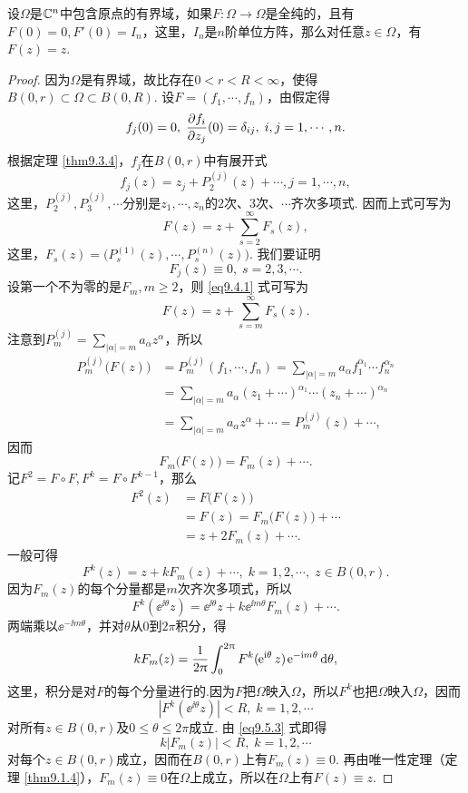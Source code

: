 \begin{theorem}\label{thm9.5.1}
设$\Omega$是$\mathbb C^n$中包含原点的有界域，如果$F:\Omega\to\Omega$是全纯的，且有$F(0)=0,F'(0)= I_n$，这里，$I_n$是$n$阶单位方阵，那么对任意$z\in\Omega$，有$F(z)=z$.
\end{theorem}
\begin{proof}
因为$\Omega$是有界域，故比存在$0<r<R<\infty$，使得$B(0,r)\subset\Omega\subset B(0,R)$. 设$F=(f_1,\cdots,f_n)$，由假定得
\[f_j(0)=0,\;\frac{\partial f_i}{\partial z_j}(0)=\delta_{ij},\;i,j=1,\cdots,n.\]
根据定理 \ref{thm9.3.4}，$f_j$在$B(0,r)$中有展开式
\[f_j(z)=z_j+P_2^{(j)}(z)+\cdots,j=1,\cdots,n,\]
这里，$P_2^{(j)},P_3^{(j)},\cdots$分别是$z_1,\cdots,z_n$的$2$次、$3$次、$\cdots$齐次多项式. 因而上式可写为
\begin{equation}\label{eq9.5.1}
F(z)=z+\sum_{s=2}^\infty F_s(z),
\end{equation}
这里，$F_s(z)=\big(P_s^{(1)}(z),\cdots,P_s^{(n)}(z)\big)$. 我们要证明
\[F_j(z)\equiv0,\;s=2,3,\cdots.\]
设第一个不为零的是$F_m,m\ge2$，则 \eqref{eq9.4.1} 式可写为
\begin{equation}\label{eq9.5.2}
F(z)=z+\sum_{s=m}^\infty F_s(z).
\end{equation}
注意到$P_m^{(j)}=\sum_{|\alpha|=m}a_\alpha z^\alpha$，所以
\begin{align*}
P_m^{(j)}\big(F(z)\big)&=P_m^{(j)}(f_1,\cdots,f_n)=\sum_{|\alpha|=m}a_\alpha
f_1^{\alpha_1}\cdots f_n^{\alpha_n}\\
&=\sum_{|\alpha|=m}a_\alpha(z_1+\cdots)^{\alpha_1}\cdots(z_n+\cdots)^{\alpha_n}\\
&=\sum_{|\alpha|=m}a_\alpha z^\alpha+\cdots=P_m^{(j)}(z)+\cdots,
\end{align*}
因而
\[F_m\big(F(z)\big)=F_m(z)+\cdots.\]
记$F^2=F\circ F,F^k=F\circ F^{k-1}$，那么
\begin{align*}
F^2(z)&=F\big(F(z)\big)\\
&=F(z)=F_m\big(F(z)\big)+\cdots\\
&=z+2F_m(z)+\cdots.
\end{align*}
一般可得
\[F^k(z)=z+kF_m(z)+\cdots,\;k=1,2,\cdots,\;z\in B(0,r).\]
因为$F_m(z)$的每个分量都是$m$次齐次多项式，所以
\[F^k(\ee^{\ii\theta}z)=\ee^{\ii\theta}z+k\ee^{\ii m\theta}F_m(z)+\cdots.\]
两端乘以$\ee^{-\ii m\theta}$，并对$\theta$从$0$到$2\pi$积分，得
\begin{equation}\label{eq9.5.3}
kF_m(z)=\frac1{2\uppi}\int_0^{2\uppi}F^k(\operatorname{\!\!\;\mathrm e}^{\mathrm i\theta}z)\operatorname{\!\!\;\mathrm e}^{-\mathrm i m\theta}\mathop{}\!\mathrm{d} \theta,
\end{equation}
这里，积分是对$F$的每个分量进行的.因为$F$把$\Omega$映入$\Omega$，所以$F^k$也把$\Omega$映入$\Omega$，因而
\[|F^k(\ee^{\ii\theta}z)|<R,\;k=1,2,\cdots\]
对所有$z\in B(0,r)$及$0\le\theta\le2\pi$成立. 由 \eqref{eq9.5.3} 式即得
\[k|F_m(z)|<R,\;k=1,2,\cdots\]
对每个$z\in B(0,r)$成立，因而在$B(0,r)$上有$F_m(z)\equiv0$. 再由唯一性定理（定理 \ref{thm9.1.4}），$F_m(z)\equiv0$在$\Omega$上成立，所以在$\Omega$上有$F(z)\equiv z$.
\end{proof}

